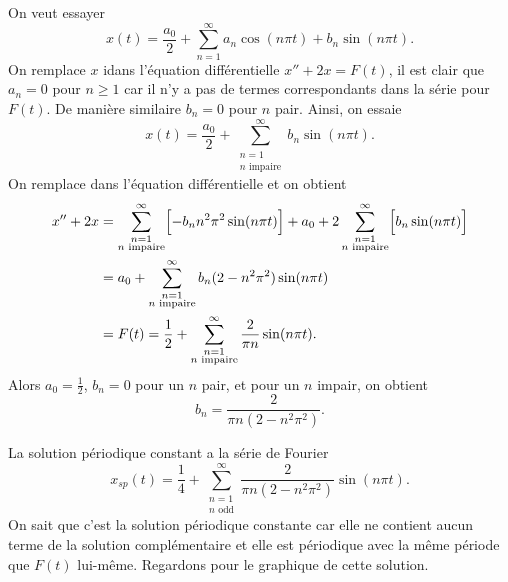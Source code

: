 \begin{example}
On veut essayer
\begin{equation*}
x(t) = \frac{a_0}{2} + \sum_{n=1}^\infty
a_n \cos (n \pi t) +
b_n \sin (n \pi t) .
\end{equation*}
On remplace $x$ idans l'équation différentielle $x''+2x = F(t)$,
il est clair que $a_n = 0$ pour $n \geq 1$ car il n'y a pas de termes correspondants
dans la série pour
$F(t)$.  De manière similaire $b_n = 0$ pour $n$ pair.  Ainsi, on essaie
\begin{equation*}
x(t) = \frac{a_0}{2} +
\sum_{\substack{n=1 \\ n \text{ impaire}}}^\infty
b_n \sin (n \pi t) .
\end{equation*}
On remplace dans l'équation différentielle et on obtient 
\begin{equation*}
\begin{split}
x'' + 2 x & =
\sum_{\substack{n=1 \\ n \text{ impaire}}}^\infty
\Bigl[ - b_n n^2 \pi^2 \sin (n \pi t) \Bigr] + 
a_0 +
2
\sum_{\substack{n=1 \\ n \text{ impaire}}}^\infty
\Bigl[ b_n \sin (n \pi t) \Bigr]
\\
& =
a_0 +
\sum_{\substack{n=1 \\ n \text{ impaire}}}^\infty
b_n (2 - n^2 \pi^2 ) \sin (n \pi t)
\\
& =
F(t) = \frac{1}{2} + \sum_{\substack{n=1 \\ n \text{ impaire}}}^\infty
\frac{2}{\pi n} \sin (n \pi t) .
\end{split}
\end{equation*}
Alors $a_0 = \frac{1}{2}$, $b_n = 0$ pour un $n$ pair, et pour un $n$ impair, on obtient 
\begin{equation*}
b_n = 
\frac{2}{\pi n (2 - n^2 \pi^2 )} .
\end{equation*}

La solution périodique constant a la série de Fourier
\begin{equation*}
x_{sp}(t) = \frac{1}{4} + \sum_{\substack{n=1 \\ n \text{ odd}}}^\infty
\frac{2}{\pi n (2 - n^2 \pi^2 )}
\sin (n \pi t) .
\end{equation*}
On sait que c'est la solution périodique constante car elle ne contient aucun terme
de la solution complémentaire et elle est périodique avec la même période que
$ F (t) $ lui-même. Regardons  pour le graphique de cette solution.
\begin{myfig}
\capstart
{}
\caption{Graphe de la fonction périodique constante  $x_{sp}$, de l' 
.%
\label{afs:steadyexfig}}
\end{myfig}
\end{example}

